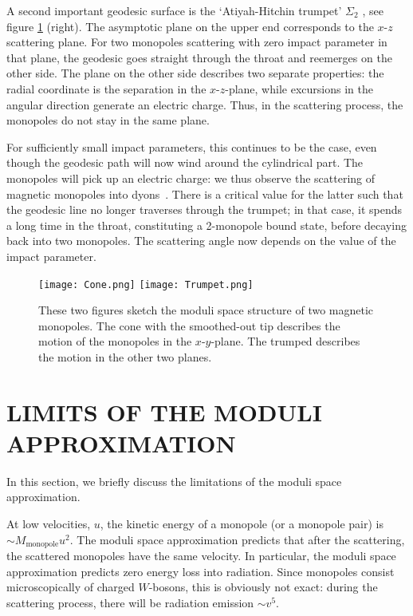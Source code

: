 \documentclass[aps, prd, twocolumn, superscriptaddress, preprintnumbers, nofootinbib, longbibliography]{revtex4-1}
\begin{document}
A second important geodesic surface is the `Atiyah-Hitchin trumpet' $\Sigma_2$ \cite{Atiyah-Hitchin1988}, see figure \ref{fig:moduli-space} (right). The asymptotic plane on the upper end corresponds to the $x$-$z$ scattering plane. For two monopoles scattering with zero impact parameter in that plane, the geodesic goes straight through the throat and reemerges on the other side. The plane on the other side describes two separate properties: the radial coordinate is the separation in the $x$-$z$-plane, while excursions in the angular direction generate an electric charge. Thus, in the scattering process, the monopoles do not stay in the same plane.

For sufficiently small impact parameters, this continues to be the case, even though the geodesic path will now wind around the cylindrical part. The monopoles will pick up an electric charge: we thus observe the scattering of magnetic monopoles into dyons~\cite{Atiyah:1985dv, Gibbons:1986df}. There is a critical value for the latter such that the geodesic line no longer traverses through the trumpet; in that case, it spends a long time in the throat, constituting a 2-monopole bound state, before decaying back into two monopoles. The scattering angle now depends on the value of the impact parameter. 

\begin{figure}[h]
    \texttt{[image: Cone.png]}
    \texttt{[image: Trumpet.png]}
    \caption{These two figures sketch the moduli space structure of two magnetic monopoles. The cone with the smoothed-out tip describes the motion of the monopoles in the $x$-$y$-plane. The trumped describes the motion in the other two planes.}
    \label{fig:moduli-space}
\end{figure} 


\section{\MakeUppercase{Limits of the Moduli Approximation}}
\label{sec:limits-of-the-moduli-approximation}
In this section, we briefly discuss the limitations of the moduli space approximation. 

At low velocities, $u$, the kinetic energy of a monopole (or a monopole pair) is $\sim M_\text{monopole} u^2$. The moduli space approximation predicts that after the scattering, the scattered monopoles have the same velocity. In particular, the moduli space approximation predicts zero energy loss into radiation. Since monopoles consist microscopically of charged $W$-bosons, this is obviously not exact: during the scattering process, there will be radiation emission $\sim v^5$\cite{Manton:1988bn}. 
\end{document}
